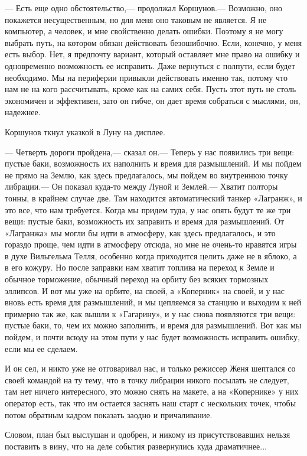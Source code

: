 \documentclass[11pt,a4paper,oneside]{article}
\begin{document}
— Есть еще одно обстоятельство,— продолжал Коршунов.— Возможно, оно покажется несущественным, но для меня оно таковым не является. Я не компьютер, а человек, и мне свойственно делать ошибки. Поэтому я не могу выбрать путь, на котором обязан действовать безошибочно. Если, конечно, у меня есть выбор. Нет, я предпочту вариант, который оставляет мне право на ошибку и одновременно возможность ее исправить. Даже вернуться с полпути, если будет необходимо. Мы на периферии привыкли действовать именно так, потому что нам не на кого рассчитывать, кроме как на самих себя. Пусть этот путь не столь экономичен и эффективен, зато он гибче, он дает время собраться с мыслями, он, надежнее.

Коршунов ткнул указкой в Луну на дисплее.

— Четверть дороги пройдена,— сказал он.— Теперь у нас появились три вещи: пустые баки, возможность их наполнить и время для размышлений. И мы пойдем не прямо на Землю, как здесь предлагалось, мы пойдем во внутреннюю точку либрации.— Он показал куда-то между Луной и Землей.— Хватит полторы тонны, в крайнем случае две. Там находится автоматический танкер «Лагранж», и это все, что нам требуется. Когда мы придем туда, у нас опять будут те же три вещи: пустые баки, возможность их заправить и время для размышлений. От «Лагранжа» мы могли бы идти в атмосферу, как здесь предлагалось, и это гораздо проще, чем идти в атмосферу отсюда, но мне не очень-то нравятся игры в духе Вильгельма Телля, особенно когда приходится целить даже не в яблоко, а в его кожуру. Но после заправки нам хватит топлива на переход к Земле и обычное торможение, обычный переход на орбиту без всяких тормозных эллипсов. И вот мы уже на орбите, на своей, а «Коперник» на своей, и у нас вновь есть время для размышлений, и мы цепляемся за станцию и выходим к ней примерно так же, как вышли к «Гагарину», и у нас снова появляются три вещи: пустые баки, то, чем их можно заполнить, и время для размышлений. Вот как мы пойдем, и почти всюду на этом пути у нас будет возможность исправить ошибку, если мы ее сделаем.

И он сел, и никто уже не отговаривал нас, и только режиссер Женя шептался со своей командой на ту тему, что в точку либрации никого посылать не следует, там нет ничего интересного, это можно снять на макете, а на «Копернике» у них оператор есть, так что им остается заснять наш старт с нескольких точек, чтобы потом обратным кадром показать заодно и причаливание.

Словом, план был выслушан и одобрен, и никому из присутствовавших нельзя поставить в вину, что на деле события развернулись куда драматичнее...
\end{document}
